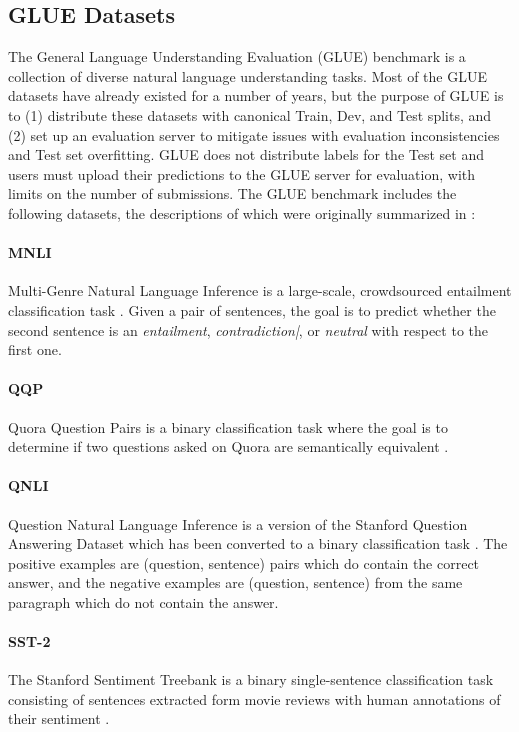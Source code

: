 	\subsection {GLUE Datasets} \label{sec4.1}
	The General Language Understanding Evaluation (GLUE) benchmark \citep{Alex2018} is a collection of diverse natural language understanding tasks. Most of the GLUE datasets have already existed for a number of years, but the purpose of GLUE is to (1) distribute these datasets with canonical Train, Dev, and Test splits, and (2) set up an evaluation server to mitigate issues with evaluation inconsistencies and Test set overfitting. GLUE does not distribute labels for the Test set and users must upload their predictions to the GLUE server for evaluation, with limits on the number of submissions.
	The GLUE benchmark includes the following datasets, the descriptions of which were originally summarized in \citet{Alex2018}:
	
	\paragraph{MNLI} Multi-Genre Natural Language Inference is a large-scale, crowdsourced entailment classification task \citep{Adina2018}. Given a pair of sentences, the goal is to predict whether the second sentence is an \emph{entailment}, \emph{contradiction|}, or \emph{neutral} with respect to the first one.
	\paragraph{QQP}  Quora Question Pairs is a binary classification task where the goal is to determine if two questions asked on Quora are semantically equivalent \citep{Chen2018}.
	\paragraph{QNLI} Question Natural Language Inference is a version of the Stanford Question Answering Dataset \citep{Pranav2016} which has been converted to a binary classification task \citep{Alex2018}. The positive examples are (question, sentence) pairs which do contain the correct answer, and the negative examples are (question, sentence) from the same paragraph which do not contain the answer.
	\paragraph{SST-2} The Stanford Sentiment Treebank is a binary single-sentence classification task consisting of sentences extracted form movie reviews with human annotations of their sentiment \citep{Richard2013}.
